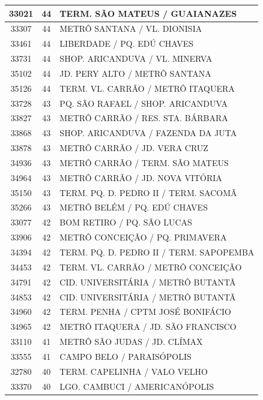 \documentclass[
	12pt,				%
	oneside,			%
	a4paper,			%
	english,			%
	brazil				%
	]{abntex2ppgsi}
\begin{document}
\begin{apendicesenv}
\begin{longtable}{c|c|p{7cm}}
\hline
    33021 & 44    & TERM. SÃO MATEUS / GUAIANAZES \\
\hline
    33307 & 44    & METRÔ SANTANA / VL. DIONISIA \\
\hline
    33461 & 44    & LIBERDADE / PQ. EDÚ CHAVES \\
\hline
    33731 & 44    & SHOP. ARICANDUVA / VL. MINERVA \\
\hline
    35102 & 44    & JD. PERY ALTO / METRÔ SANTANA \\
\hline
    35126 & 44    & TERM. VL. CARRÃO / METRÔ ITAQUERA \\
\hline
    33728 & 43    & PQ. SÃO RAFAEL / SHOP. ARICANDUVA \\
\hline
    33827 & 43    & METRÔ CARRÃO / RES. STA. BÁRBARA \\
\hline
    33868 & 43    & SHOP. ARICANDUVA / FAZENDA DA JUTA \\
\hline
    33878 & 43    & METRÔ CARRÃO / JD. VERA CRUZ \\
\hline
    34936 & 43    & METRÔ CARRÃO / TERM. SÃO MATEUS \\
\hline
    34964 & 43    & METRÔ CARRÃO / JD. NOVA VITÓRIA \\
\hline
    35150 & 43    & TERM. PQ. D. PEDRO II / TERM. SACOMÃ \\
\hline
    35266 & 43    & METRÔ BELÉM / PQ. EDÚ CHAVES \\
\hline
    33077 & 42    & BOM RETIRO / PQ. SÃO LUCAS \\
\hline
    33906 & 42    & METRÔ CONCEIÇÃO / PQ. PRIMAVERA \\
\hline
    34394 & 42    & TERM. PQ. D. PEDRO II / TERM. SAPOPEMBA \\
\hline
    34453 & 42    & TERM. VL. CARRÃO / METRÔ CONCEIÇÃO \\
\hline
    34791 & 42    & CID. UNIVERSITÁRIA / METRÔ BUTANTÃ \\
\hline
    34853 & 42    & CID. UNIVERSITÁRIA / METRÔ BUTANTÃ \\
\hline
    34960 & 42    & TERM. PENHA / CPTM JOSÉ BONIFÁCIO \\
\hline
    34965 & 42    & METRÔ ITAQUERA / JD. SÃO FRANCISCO \\
\hline
    33110 & 41    & METRÔ SÃO JUDAS / JD. CLÍMAX \\
\hline
    33555 & 41    & CAMPO BELO / PARAISÓPOLIS \\
\hline
    32780 & 40    & TERM. CAPELINHA / VALO VELHO \\
\hline
    33370 & 40    & LGO. CAMBUCI / AMERICANÓPOLIS \\

\end{longtable}
\end{apendicesenv}
\end{document}
